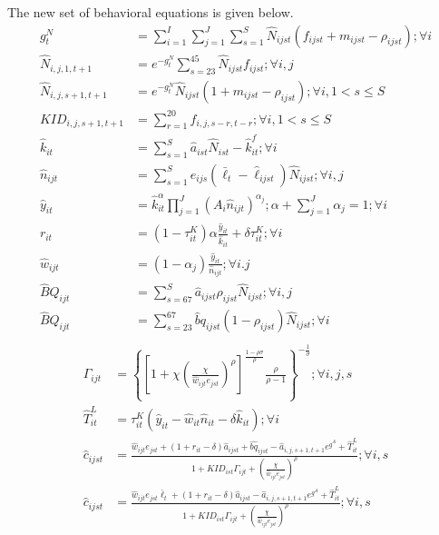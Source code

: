 \documentclass[letterpaper,12pt]{article}
\theoremstyle{definition}
\numberwithin{equation}{section}
\begin{document}
\begin{spacing}{1.5}
	The new set of behavioral equations is given below.
	\begin{align}
		g^N_t & = \sum_{i=1}^I \sum_{j=1}^J \sum_{s=1}^S \hat N_{ijst} (f_{ijst}+m_{ijst}-\rho_{ijst}) ; \forall i\\
		\hat N_{i,j,1,t+1} & = e^{-g^N_t}\sum_{s=23}^{45} \hat N_{ijst} f_{ijst} ; \forall i,j\\
		\hat N_{i,j,s+1,t+1} & = e^{-g^N_t}\hat N_{ijst} (1+m_{ijst}-\rho_{ijst}); \forall i, 1<s\le S \\
		KID_{i,j,s+1,t+1} & = \sum_{r=1}^{20} f_{i,j,s-r,t-r}; \forall i, 1<s\le S \\
	    \hat k_{it} & = \sum_{s=1}^S \hat a_{ist} \hat N_{ist} - \hat k_{it}^f; \forall i \\
		\hat n_{ijt} & = \sum_{s=1}^S e_{ijs} (\bar \ell_t - \hat \ell_{ijst}) \hat N_{ijst}; \forall i,j \\
		\hat y_{it} & = \hat k_{it}^\alpha \prod_{j=1}^J \left( A_{i} \hat n_{ijt} \right)^{\alpha_j}; \alpha + \sum_{j=1}^J \alpha_j = 1 ; \forall i \\
		r_{it} & = (1-\tau^K_{it})\alpha \frac{\hat y_{it}}{\hat k_{it}} + \delta \tau^K_{it}; \forall i \\
		\hat w_{ijt} & = (1-\alpha_j) \frac{\hat y_{it}}{\hat n_{ijt}}; \forall i.j \\
		\hat BQ_{ijt} & = \sum_{s=67}^S \hat a_{ijst} \rho_{ijst} \hat N_{ijst} ; \forall i,j \\
		\hat BQ_{ijt} & = \sum_{s=23}^{67} \hat bq_{ijst} (1-\rho_{ijst}) \hat N_{ijst}	; \forall i \\
	\end{align}
	\begin{align}
		\Gamma_{ijt} & = \left\{ \left[1 + \chi \left(\frac{\chi}{\hat w_{ijt} e_{jst}}\right)^\rho\right]^{\tfrac{1-\rho \sigma}{\rho}} \frac{\rho}{\rho-1} \right\}^{-\tfrac{1}{\sigma}}; \forall i,j,s \\
		\hat T^L_{it} & = \tau^K_{it} (\hat y_{it} - \hat w_{it}\hat n_{it} - \delta \hat k_{it}); \forall i \\
    	\hat c_{ijst} & = \frac{\hat w_{ijt} e_{jst} + (1+r_{it}-\delta)\hat a_{ijst} + \hat{bq}_{ijst} - \hat a_{i,j,s+1,t+1} e^{g^A} + \hat T^L_{it}} {1 + KID_{ist}\Gamma_{ijt} + \left(\tfrac{\chi}{\hat w_{ijt}e_{jst}}\right)^\rho}; \forall i,s \\
    	\hat c_{ijst} & = \frac{\hat w_{ijt} e_{jst} \bar \ell_t + (1+r_{it}-\delta)\hat a_{ijst} - \hat a_{i,j,s+1,t+1} e^{g^A} + \hat T^L_{it}} {1 + KID_{ist}\Gamma_{ijt} + \left(\tfrac{\chi}{\hat w_{ijt}e_{jst}}\right)^\rho}; \forall i,s \\

\end{align}
\end{spacing}
\end{document}
